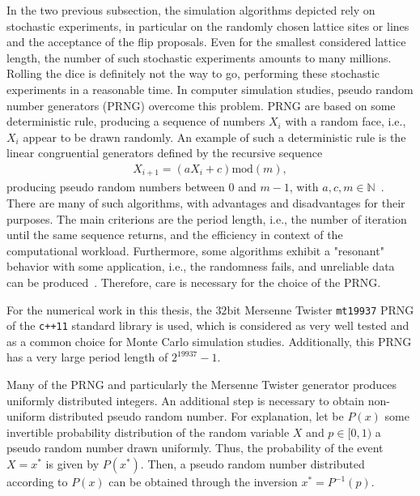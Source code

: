 In the two previous subsection, the simulation algorithms depicted rely on stochastic experiments, in particular on the randomly
chosen lattice sites or lines and the acceptance of the flip proposals. Even for the smallest considered lattice length, the number 
of such stochastic experiments amounts to many millions. Rolling the dice is definitely not the way to go, performing these stochastic
experiments in a reasonable time. In computer simulation studies, pseudo random number generators (PRNG) overcome
this problem. PRNG are based on some deterministic rule, producing a sequence of numbers $X_i$ with a random face, i.e., $X_i$ appear 
to be drawn randomly. An example of such a deterministic rule is the linear congruential generators defined by the recursive sequence
\begin{align*}
    X_{i+1}=(aX_i+c)\mathrm{mod}(m),
\end{align*}
producing pseudo random numbers between $0$ and $m\!-\!1$, with $a,c,m\!\in\!\mathbb{N}$~\cite{Janke2002}. There are many of such algorithms,
with advantages and disadvantages for their purposes. The main criterions are the period length, i.e., the number of iteration 
until the same sequence returns, and the efficiency in context of the computational workload. Furthermore, some algorithms exhibit a "resonant" 
behavior with some application, i.e., the randomness fails, and unreliable data can be produced~\cite{Janke2002}. Therefore, care is 
necessary for the choice of the PRNG. 

For the numerical work in this thesis, the $32\mathrm{bit}$ Mersenne Twister \verb|mt19937| PRNG of 
the \verb|c++11| standard library is used, which is considered as very well tested and as a common choice for Monte Carlo simulation studies.
Additionally, this PRNG has a very large period length of $2^{19937}\!-\!1$. 

Many of the PRNG and particularly the Mersenne Twister generator produces uniformly distributed integers. An additional step is necessary to obtain 
non-uniform distributed pseudo random number. For explanation, let be $P(x)$ some invertible probability distribution of the random variable $X$ 
and $p\!\in\![0,1)$ a pseudo random number drawn uniformly. Thus, the probability of the event $X\!=\!x^*$ is given by $P(x^*)$. Then, a 
pseudo random number distributed according to $P(x)$ can be obtained through the inversion $x^*\!=\!P^{-1}(p)$.~\cite{Janke2002}




